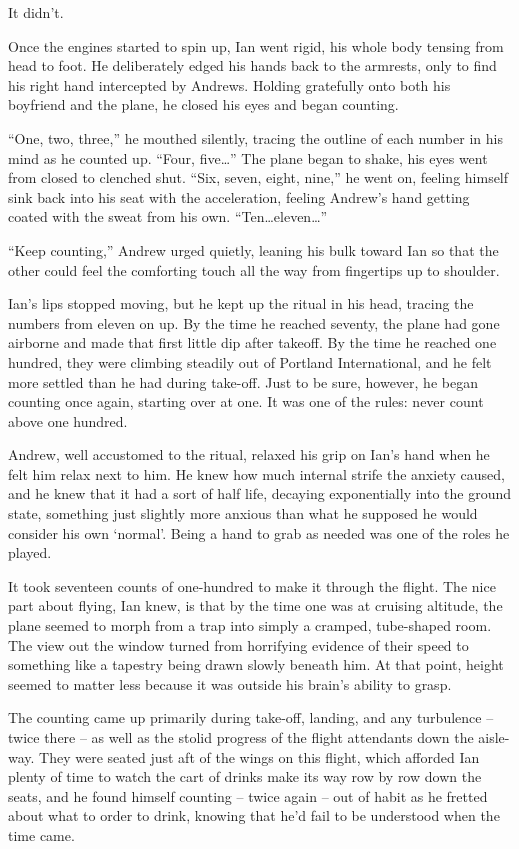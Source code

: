 It didn't.

Once the engines started to spin up, Ian went rigid, his whole body tensing from head to foot. He deliberately edged his hands back to the armrests, only to find his right hand intercepted by Andrews. Holding gratefully onto both his boyfriend and the plane, he closed his eyes and began counting.

``One, two, three,'' he mouthed silently, tracing the outline of each number in his mind as he counted up. ``Four, five\ldots{}'' The plane began to shake, his eyes went from closed to clenched shut. ``Six, seven, eight, nine,'' he went on, feeling himself sink back into his seat with the acceleration, feeling Andrew's hand getting coated with the sweat from his own. ``Ten\ldots{}eleven\ldots{}''

``Keep counting,'' Andrew urged quietly, leaning his bulk toward Ian so that the other could feel the comforting touch all the way from fingertips up to shoulder.

Ian's lips stopped moving, but he kept up the ritual in his head, tracing the numbers from eleven on up. By the time he reached seventy, the plane had gone airborne and made that first little dip after takeoff. By the time he reached one hundred, they were climbing steadily out of Portland International, and he felt more settled than he had during take-off. Just to be sure, however, he began counting once again, starting over at one. It was one of the rules: never count above one hundred.

Andrew, well accustomed to the ritual, relaxed his grip on Ian's hand when he felt him relax next to him. He knew how much internal strife the anxiety caused, and he knew that it had a sort of half life, decaying exponentially into the ground state, something just slightly more anxious than what he supposed he would consider his own `normal'. Being a hand to grab as needed was one of the roles he played.

\secdiv

It took seventeen counts of one-hundred to make it through the flight. The nice part about flying, Ian knew, is that by the time one was at cruising altitude, the plane seemed to morph from a trap into simply a cramped, tube-shaped room. The view out the window turned from horrifying evidence of their speed to something like a tapestry being drawn slowly beneath him. At that point, height seemed to matter less because it was outside his brain's ability to grasp.

The counting came up primarily during take-off, landing, and any turbulence -- twice there -- as well as the stolid progress of the flight attendants down the aisle-way. They were seated just aft of the wings on this flight, which afforded Ian plenty of time to watch the cart of drinks make its way row by row down the seats, and he found himself counting -- twice again -- out of habit as he fretted about what to order to drink, knowing that he'd fail to be understood when the time came.

